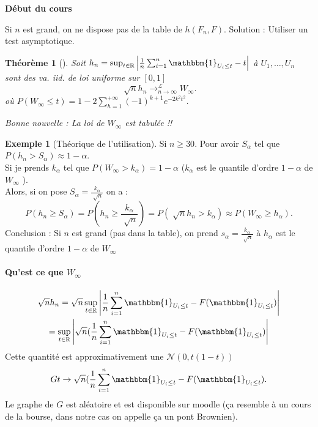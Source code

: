 \documentclass{article}
\theoremstyle{plain}%
\newtheorem{thm}{Théorème}[section]
\theoremstyle{definition}
\newtheorem{exmp}{Exemple}[section]
\theoremstyle{remark}
\begin{document}
\textbf{Début du cours}

Si $ n $ est grand, on ne dispose pas de la table de $ h(F_n,F) $. Solution : Utiliser un test asymptotique.

\begin{thm}[]
    Soit $ h_n = \sup _{t \in \mathbb{R}} \left| \frac{1}{n}\sum_{i=1}^{n} \mathbbm{1}_{U_i \leq t} - t \right| $ à $ U_1, \dots, U_n $ sont des va. iid. de loi uniforme sur $ [0,1] $ 
    \[
        \sqrt[]{n}h_n \to ^{\mathcal{L}}_{n \to \infty } W_{\infty }
    .\]
    où $ P(W_\infty \leq t) = 1 - 2 \sum_{h=1}^{+\infty}(-1)^{k+1} e^{-2k^2t^2} $. 

    Bonne nouvelle : La loi de $ W_\infty  $ est tabulée !! 
\end{thm}
\begin{exmp}[Théorique de l'utilisation]
    Si $ n \geq 30 $. Pour avoir $ S_\alpha  $ tel que $ P(h_n > S_\alpha ) \approx 1 - \alpha $. \\
    Si je prends $ k_\alpha  $ tel que $ P(W_\infty > k_\alpha ) = 1 - \alpha  $ ($ k_\alpha  $ est le quantile d'ordre $ 1-\alpha  $ de $ W_\infty  $ ). \\
    Alors, si on pose $ S_\alpha = \frac{k_\alpha }{\sqrt[]{n}} $ on a : 
    \[
        P(h_n \geq S_\alpha ) = P(h_n \geq \frac{k_\alpha }{\sqrt[]{n}}) = P(\sqrt[]{n} h_n > k_\alpha ) \approx P(W_\infty \geq h_\alpha )
    .\]
    Conclusion : Si $ n $ est grand (pas dans la table), on prend $ s_\alpha  = \frac{k_\alpha }{\sqrt[]{n}}$ à $ h_\alpha  $ est le quantile d'ordre $ 1-\alpha  $ de $ W_\infty  $ 
\end{exmp}

\paragraph{Qu'est ce que $ W_\infty $ }

\begin{gather*}
    \sqrt{n} h_n = \sqrt{n}  \sup _{t \in \mathbb{R}}  \left| \frac{1}{n} \sum_{i=1}^{n} \mathbbm{1}_{U_i \leq t} - F(\mathbbm{1}_{U_i \leq t}) \right| \\
        = \sup _{t \in \mathbb{R}} \left| \sqrt{n} (\frac{1}{n}\sum_{i=1}^{n}\mathbbm{1}_{U_i \leq t}- F(\mathbbm{1}_{U_i \leq t}) \right| 
\end{gather*}
Cette quantité est approximativement une $ \mathcal{N}(0, t(1-t)) $ 
\[
    Gt\to \sqrt{n} (\frac{1}{n}\sum_{i=1}^{n}\mathbbm{1}_{U_i \leq t}- F(\mathbbm{1}_{U_i \leq t})
.\]
Le graphe de $ G $ est aléatoire et est disponible sur moodle (ça resemble à un cours de la bourse, dans notre cas on appelle ça un pont Brownien).
\end{document}

